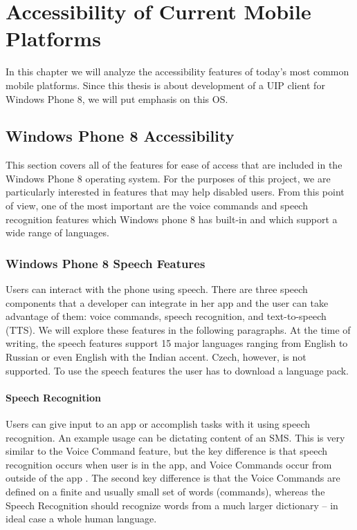 \chapter{Accessibility of Current Mobile Platforms}
In this chapter we will analyze the accessibility features of today's most common mobile platforms. Since this thesis is about development of a UIP client for Windows Phone 8, we will put emphasis on this OS.
\section{Windows Phone 8 Accessibility}
This section covers all of the features for ease of access that are included in the Windows Phone 8 operating system. For the purposes of this project, we are particularly interested in features that may help disabled users. From this point of view, one of the most important are the voice commands and speech recognition features which Windows phone 8 has built-in and which support a wide range of languages.

\subsection{Windows Phone 8 Speech Features}
Users can interact with the phone using speech. There are three speech components that a developer can integrate in her app and the user can take advantage of them: voice commands, speech recognition, and text-to-speech (TTS). We will explore these features in the following paragraphs.
At the time of writing, the speech features support 15 major languages ranging from English to Russian or even English with the Indian accent. Czech, however, is not supported. To use the speech features the user has to download a language pack.

\subsubsection{Speech Recognition}
Users can give input to an app or accomplish tasks with it using speech recognition. An example usage can be dictating content of an SMS. This is very similar to the Voice Command feature, but the key difference is that speech recognition occurs when user is in the app, and Voice Commands occur from outside of the app \cite{phone8speech}. The second key difference is that the Voice Commands are defined on a finite and usually small set of words (commands), whereas the Speech Recognition should recognize words from a much larger dictionary – in ideal case a whole human language.

